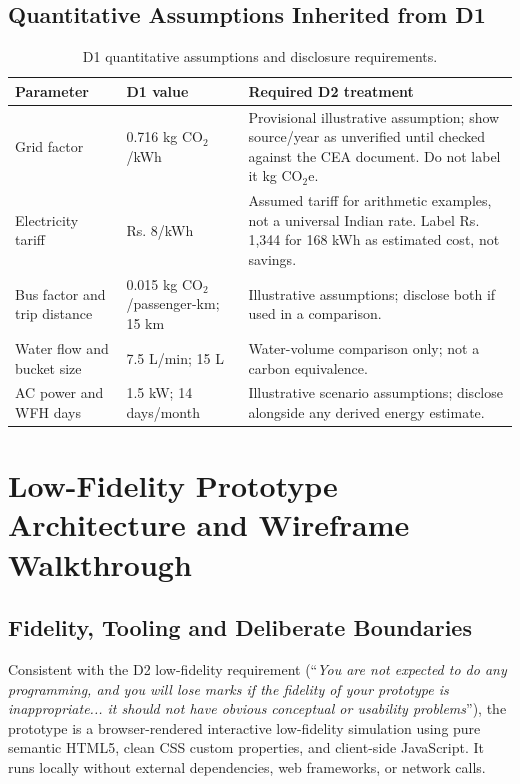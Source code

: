 \documentclass[12pt,a4paper]{article}
\begin{document}
\subsection{Quantitative Assumptions Inherited from D1}
\begin{table}[ht]
\centering
\small
\caption{D1 quantitative assumptions and disclosure requirements.}
\begin{tabularx}{\textwidth}{@{}p{3.1cm}p{3.2cm}X@{}}
\toprule
\textbf{Parameter} & \textbf{D1 value} & \textbf{Required D2 treatment}\\
\midrule
Grid factor & 0.716 kg CO$_2$/kWh & Provisional illustrative assumption; show source/year as unverified until checked against the CEA document. Do not label it kg CO$_2$e.\\
Electricity tariff & Rs. 8/kWh & Assumed tariff for arithmetic examples, not a universal Indian rate. Label Rs. 1,344 for 168 kWh as estimated cost, not savings.\\
Bus factor and trip distance & 0.015 kg CO$_2$/passenger-km; 15 km & Illustrative assumptions; disclose both if used in a comparison.\\
Water flow and bucket size & 7.5 L/min; 15 L & Water-volume comparison only; not a carbon equivalence.\\
AC power and WFH days & 1.5 kW; 14 days/month & Illustrative scenario assumptions; disclose alongside any derived energy estimate.\\
\bottomrule
\end{tabularx}
\end{table}


\section{Low-Fidelity Prototype Architecture and Wireframe Walkthrough}

\subsection{Fidelity, Tooling and Deliberate Boundaries}
Consistent with the D2 low-fidelity requirement (``\emph{You are not expected to do any programming, and you will lose marks if the fidelity of your prototype is inappropriate... it should not have obvious conceptual or usability problems}''), the prototype is a browser-rendered interactive low-fidelity simulation using pure semantic HTML5, clean CSS custom properties, and client-side JavaScript. It runs locally without external dependencies, web frameworks, or network calls.
\end{document}
